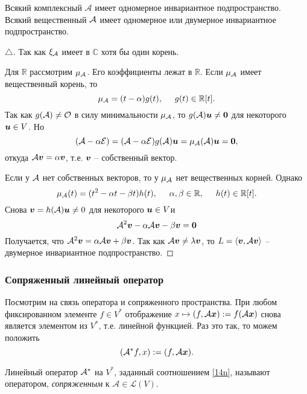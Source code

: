 \begin{to_thr} 
    Всякий комплексный $\mathcal A$ имеет одномерное инвариантное подпространство. Всякий вещественный $\mathcal A$ имеет одномерное или двумерное инвариантное подпространство.
\end{to_thr}


\begin{proof}[$\triangle$]
    Так как $\xi_{\mathcal A}$ имеет в $\mathbb{C}$ хотя бы один корень.

    Для $\mathbb{R}$ рассмотрим $\mu_{\mathcal A}$. Его коэффициенты лежат в $\mathbb{R}$. Если $\mu_{\mathcal A}$ имеет вещественный корень, то
    $$
        \mu_{\mathcal A} = (t - \alpha) g(t), \hspace{0.5cm} g(t) \in \mathbb{R}[t].
    $$
    Так как $g(\mathcal A) \neq \mathcal O$ в силу минимальности $\mu_{\mathcal A}$, то $g(\mathcal A) \mbox{\boldmath $u$} \neq \mbox{\boldmath $0$}$ для некоторого $\mbox{\boldmath $u$} \in V$. Но
    $$
        (\mathcal A - \alpha \mathcal E) = (\mathcal A - \alpha \mathcal E) g(\mathcal A) \mbox{\boldmath $u$} = \mu_{\mathcal A} (\mathcal A) \mbox{\boldmath $u$} = \mbox{\boldmath $0$},
    $$
    откуда $\mathcal A \mbox{\boldmath $v$} = \alpha \mbox{\boldmath $v$}$, т.е. $\mbox{\boldmath $v$}$ -- собственный вектор.

    Если у $\mathcal A$ нет собственных векторов, то у $\mu_{\mathcal A}$ нет вещественных корней. Однако
    $$
        \mu_{\mathcal A} (t) = (t^{2} - \alpha t - \beta t) h(t), \hspace{0.5cm}   \alpha, \beta \in \mathbb{R}, \hspace{0.5cm} h(t) \in \mathbb{R}[t].
    $$
    Снова $\mbox{\boldmath $v$} = h(\mathcal A) \mbox{\boldmath $u$} \neq 0$ для некоторого $\mbox{\boldmath $u$} \in V$и 
    $$
        \mathcal A^2 \mbox{\boldmath $v$} - \alpha \mathcal A \mbox{\boldmath $v$} - \beta \mbox{\boldmath $v$} = \mbox{\boldmath $0$}
    $$
    Получается, что $\mathcal A^2 \mbox{\boldmath $v$} = \alpha \mathcal A \mbox{\boldmath $v$} + \beta \mbox{\boldmath $v$}$. Так как $\mathcal A \mbox{\boldmath $v$} \neq \lambda \mbox{\boldmath $v$}$, то $L = \langle \mbox{\boldmath $v$}, \mathcal A \mbox{\boldmath $v$}\rangle$ -- двумерное инвариантное подпространство.
\end{proof}

\subsubsection{Сопряженный линейный оператор}

Посмотрим на связь оператора и сопряженного пространства. При любом фиксированном элементе $f \in V^*$ отображение $x \mapsto (f, \mathcal A \mbox{\boldmath $x$}) := f(\mathcal A \mbox{\boldmath $x$})$ снова является элементом из $V^*$,  т.е. линейной функцией. Раз это так, то можем положить 
\begin{equation}
\label{14n}
    (\mathcal A^* f, x) := (f, \mathcal A \mbox{\boldmath $x$}).
\end{equation} 

\begin{to_def} 
    Линейный оператор $\mathcal A^*$ на $V^*$, заданный соотношением \eqref{14n}, называют оператором, \textit{сопряженным} к $\mathcal A \in \mathcal L (V)$. 
\end{to_def}

